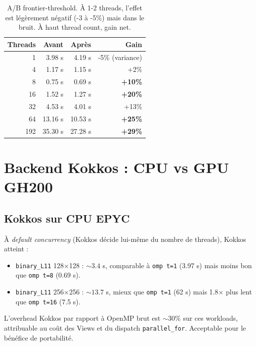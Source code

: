 \begin{table}[H]
\centering
\begin{tabular}{rrrr}
\toprule
\textbf{Threads} & \textbf{Avant} & \textbf{Après} & \textbf{Gain} \\
\midrule
1 & 3.98 s & 4.19 s & -5\% (variance) \\
4 & 1.17 s & 1.15 s & +2\% \\
8 & 0.75 s & 0.69 s & \textbf{+10\%} \\
16 & 1.52 s & 1.27 s & \textbf{+20\%} \\
32 & 4.53 s & 4.01 s & +13\% \\
64 & 13.16 s & 10.53 s & \textbf{+25\%} \\
192 & 35.30 s & 27.28 s & \textbf{+29\%} \\
\bottomrule
\end{tabular}
\caption{A/B frontier-threshold. À 1-2 threads, l'effet est légèrement négatif (-3 à -5\%) mais dans le bruit. À haut thread count, gain net.}
\label{tab:res:frontier_threshold}
\end{table}

\section{Backend Kokkos : CPU vs GPU GH200}
\label{sec:res:kokkos}

\subsection{Kokkos sur CPU EPYC}

À \textit{default concurrency} (Kokkos décide lui-même du nombre de threads), Kokkos atteint :
\begin{itemize}
    \item \texttt{binary\_L11} 128×128 : $\sim 3.4$ s, comparable à \texttt{omp t=1} (3.97 s) mais moins bon que \texttt{omp t=8} (0.69 s).
    \item \texttt{binary\_L11} 256×256 : $\sim 13.7$ s, mieux que \texttt{omp t=1} (62 s) mais 1.8× plus lent que \texttt{omp t=16} (7.5 s).
\end{itemize}

L'overhead Kokkos par rapport à OpenMP brut est $\sim 30\%$ sur ces workloads, attribuable au coût des Views et du dispatch \texttt{parallel\_for}. Acceptable pour le bénéfice de portabilité.

